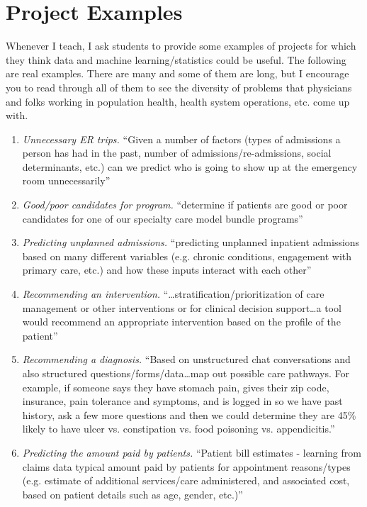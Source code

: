 
\section{Project Examples}

Whenever I teach, I ask students to provide some examples of projects for which they think data and machine learning/statistics could be useful. The following are real examples. There are many and some of them are long, but I encourage you to read through all of them to see the diversity of problems that physicians and folks working in population health, health system operations, etc. come up with.

\begin{enumerate}
\item \textit{Unnecessary ER trips.} ``Given a number of factors (types of admissions a person has had in the past, number of admissions/re-admissions, social determinants, etc.) can we predict who is going to show up at the emergency room unnecessarily''
\item \textit{Good/poor candidates for program.} ``determine if patients are good or poor candidates for one of our specialty care model bundle programs''
\item \textit{Predicting unplanned admissions.} ``predicting unplanned inpatient admissions based on many different variables (e.g. chronic conditions, engagement with primary care, etc.) and how these inputs interact with each other''
\item \textit{Recommending an intervention.} ``\dots stratification/prioritization of care management or other interventions or for clinical decision support\dots a tool would recommend an appropriate intervention based on the profile of the patient''
\item \textit{Recommending a diagnosis.} ``Based on unstructured chat conversations and also structured questions/forms/data\dots map out possible care pathways. For example, if someone says they have stomach pain, gives their zip code, insurance, pain tolerance and symptoms, and is logged in so we have past history, ask a few more questions and then we could determine they are 45\% likely to have ulcer vs. constipation vs. food poisoning vs. appendicitis.''
\item \textit{Predicting the amount paid by patients.} ``Patient bill estimates - learning from claims data typical amount paid by patients for appointment reasons/types (e.g. estimate of additional services/care administered, and associated cost, based on patient details such as age, gender, etc.)''

\end{enumerate}
